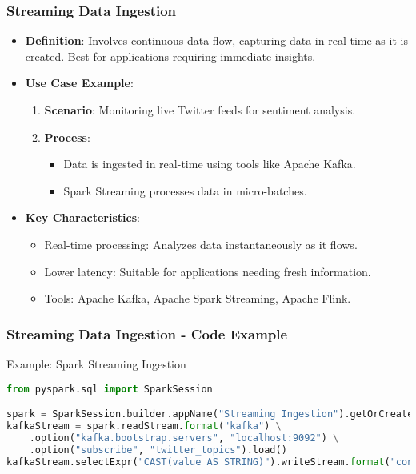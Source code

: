 \documentclass[aspectratio=169]{beamer}
\begin{document}
\begin{frame}
    \frametitle{Streaming Data Ingestion}
    \begin{itemize}
        \item \textbf{Definition}: Involves continuous data flow, capturing data in real-time as it is created. Best for applications requiring immediate insights.
        
        \item \textbf{Use Case Example}:
            \begin{enumerate}
                \item \textbf{Scenario}: Monitoring live Twitter feeds for sentiment analysis.
                \item \textbf{Process}:
                    \begin{itemize}
                        \item Data is ingested in real-time using tools like Apache Kafka.
                        \item Spark Streaming processes data in micro-batches.
                    \end{itemize}
            \end{enumerate}
        
        \item \textbf{Key Characteristics}:
            \begin{itemize}
                \item Real-time processing: Analyzes data instantaneously as it flows.
                \item Lower latency: Suitable for applications needing fresh information.
                \item Tools: Apache Kafka, Apache Spark Streaming, Apache Flink.
            \end{itemize}
    \end{itemize}
\end{frame}

\begin{frame}[fragile]
    \frametitle{Streaming Data Ingestion - Code Example}
    \begin{block}{Example: Spark Streaming Ingestion}
        \begin{lstlisting}[language=python]
from pyspark.sql import SparkSession

spark = SparkSession.builder.appName("Streaming Ingestion").getOrCreate()
kafkaStream = spark.readStream.format("kafka") \
    .option("kafka.bootstrap.servers", "localhost:9092") \
    .option("subscribe", "twitter_topics").load()
kafkaStream.selectExpr("CAST(value AS STRING)").writeStream.format("console").start()
        \end{lstlisting}
    \end{block}
\end{frame}
\end{document}
